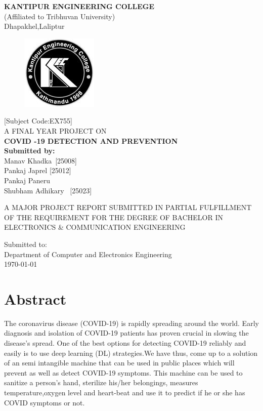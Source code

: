 \documentclass[a4paper,12pt]{report}
\begin{document}
   \begin{center}
   \textbf{KANTIPUR ENGINEERING COLLEGE}\\
   (Affiliated to Tribhuvan University)\\
   Dhapakhel,Laliptur\\
   \vfill
   \begin{figure}[h]  %
   \begin{center}
   \includegraphics[scale=1]{kec1.jpg}
   \end{center}
  \end{figure}
  \vfill
  
 {[Subject Code:EX755]}\\
  A FINAL YEAR PROJECT ON\\
  \textbf{COVID -19 DETECTION AND PREVENTION}\\
  \vfill
  \textbf{Submitted by:}\\
 Manav Khadka\quad \quad \quad\quad\quad\,\,\,[25008]\\
 Pankaj Japrel\quad \quad\quad\quad\qquad\,\,[25012]\\
 Pankaj Paneru\quad\quad\quad \quad\quad\quad[25013]\\
 Shubham Adhikary \quad \quad\quad\,\,\,[25023]\\
 
  \vfill
  
  A MAJOR PROJECT REPORT SUBMITTED IN PARTIAL FULFILLMENT OF THE REQUIREMENT FOR THE DEGREE OF BACHELOR IN ELECTRONICS \& COMMUNICATION ENGINEERING\\
  \vfill
  
  Submitted to:\\
  Department of Computer and Electronics Engineering\\
  \vfill 
   \today
   \thispagestyle{empty} %
  \end{center}
  \pagebreak
  
  \chapter*{Abstract}
The coronavirus disease (COVID-19) is rapidly spreading around the world. Early diagnosis
and isolation of COVID-19 patients has proven crucial in slowing the disease’s spread. One of the
best options for detecting COVID-19 reliably and easily is to use deep learning (DL) strategies.We have thus, come up to
a solution of an semi intangible machine that can be used in public places which will prevent as well as detect COVID-19 symptoms. This machine can be used to sanitize
a person’s hand, sterilize his/her belongings, measures temperature,oxygen level and heart-beat and use it to predict if he or she has COVID symptoms or not. 
\end{document}
